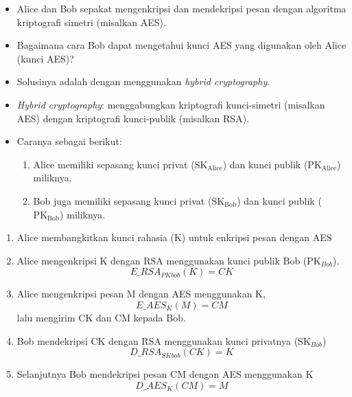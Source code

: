 \documentclass{article}
\begin{document}
\begin{itemize}
    \item Alice dan Bob sepakat mengenkripsi dan mendekripsi pesan dengan algoritma kriptografi simetri (misalkan AES).
    \item Bagaimana cara Bob dapat mengetahui kunci AES yang digunakan oleh Alice (kunci AES)?
    \item Solusinya adalah dengan menggunakan \textit{hybrid cryptography}.
    \item \textit{Hybrid cryptography}: menggabungkan kriptografi kunci-simetri (misalkan AES) dengan kriptografi kunci-publik (misalkan RSA).
    \item Caranya sebagai berikut:
    \begin{enumerate}
        \item Alice memiliki sepasang kunci privat ($\text{SK}_{\text{Alice}}$) dan kunci publik ($\text{PK}_{\text{Alice}}$) miliknya.
        \item Bob juga memiliki sepasang kunci privat ($\text{SK}_{\text{Bob}}$) dan kunci publik ($\text{PK}_{\text{Bob}}$) miliknya.
    \end{enumerate}
\end{itemize}

\newpage


\begin{enumerate}
  \item[3)] Alice membangkitkan kunci rahasia (K) untuk enkripsi pesan dengan AES
  \item[4)] Alice mengenkripsi K dengan RSA menggunakan kunci publik Bob (PK$_{Bob}$).
  \[ E\_RSA_{PKbob}(K) = CK \]
  \item[5)] Alice mengenkripsi pesan M dengan AES menggunakan K,
  \[ E\_AES_{K}(M) = CM \]
  lalu mengirim CK dan CM kepada Bob.
  \item[6)] Bob mendekripsi CK dengan RSA menggunakan kunci privatnya (SK$_{Bob}$)
  \[ D\_RSA_{SKbob}(CK) = K \]
  \item[7)] Selanjutnya Bob mendekripsi pesan CM dengan AES menggunakan K
  \[ D\_AES_{K}(CM) = M \]
\end{enumerate}

\vspace{10mm}

\newpage

\end{document}
